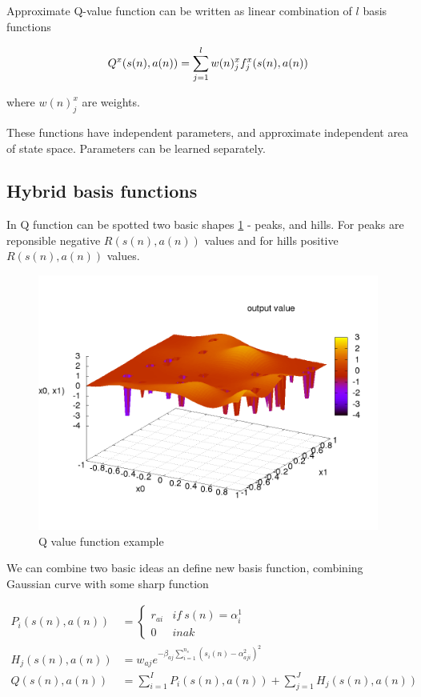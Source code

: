 \documentclass{acmbulletin}
\begin{document}
Approximate Q-value function can be written as linear combination of $l$
basis functions

\begin{align}
Q^x(s(n), a(n)) = \sum\limits_{j=1}^{l} w(n)_j^x f_j^x(\boldmath{s(n), a(n)})
\label{eq:knn_y_update}
\end{align}

where $w(n)_j^x$ are weights.

These functions have independent parameters, and approximate independent area
of state space. Parameters can be learned separately.



\subsection{Hybrid basis functions}

In Q function can be spotted two basic shapes \ref{img:peak_hill_funcion} - peaks,
and hills. For peaks are reponsible negative $R(s(n), a(n))$ values and for hills
positive $R(s(n), a(n))$ values.

\begin{figure}[]
\center
\includegraphics[scale=.3]{../pictures/peak_hill_function.png}
\caption{Q value function example}
\label{img:peak_hill_funcion}
\end{figure}

We can combine two basic ideas an define new basis function, combining
Gaussian curve with some sharp function

\begin{align}
P_i(s(n), a(n)) &=
\left\{
	\begin{array}{ll}
		r_{ai}  & if \ s(n) = \alpha^1_i \\
		0 & inak
	\end{array}
\right. \\
  H_j(s(n), a(n)) &= w_{aj} e^{ -\beta_{aj} \sum\limits_{i=1}^{n_s}{(s_i(n) - \alpha^2_{aji})^2 }} \\
  Q(s(n), a(n)) &= \sum\limits_{i=1}^{I} P_i(s(n),a(n)) + \sum\limits_{j=1}^{J} H_j(s(n), a(n))
  \label{eq:peak_hill}
\end{align}
\end{document}
